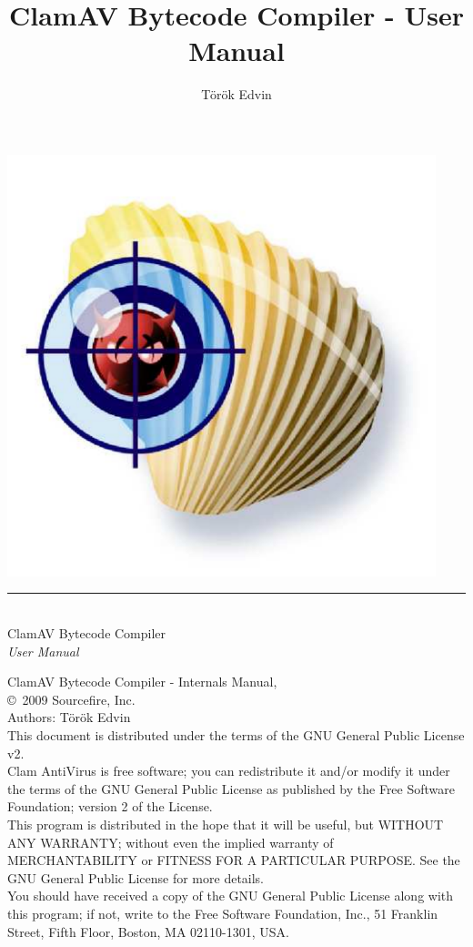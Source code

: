 \documentclass[a4paper,titlepage,12pt,english]{book}
\title{ClamAV Bytecode Compiler - User Manual}
\author{T\"{o}r\"{o}k Edvin}
\begin{document}
\frontmatter
\setcounter{page}{0}
\pagestyle{empty}
\includegraphics[width=353pt]{clam}
\vspace{3cm}
\begin{flushright}
  \rule[-1ex]{8cm}{3pt}\\
  \huge ClamAV Bytecode Compiler\\
        \huge \emph{User Manual}\\
\end{flushright}
\newpage
\setcounter{page}{1}
\pagestyle{fancy}
\tableofcontents
\vspace{1.0cm}
\noindent
\begin{boxedminipage}[b]{\textwidth}
    ClamAV Bytecode Compiler - Internals Manual,\\
    \copyright \  2009 Sourcefire, Inc.\\
    Authors: T\"{o}r\"{o}k Edvin\\
    This document is distributed under the terms of the GNU General
    Public License v2.\\

    Clam AntiVirus is free software; you can redistribute it and/or modify
    it under the terms of the GNU General Public License as published by
    the Free Software Foundation; version 2 of the License.\\

    This program is distributed in the hope that it will be useful,
    but WITHOUT ANY WARRANTY; without even the implied warranty of
    MERCHANTABILITY or FITNESS FOR A PARTICULAR PURPOSE.  See the
    GNU General Public License for more details.\\

    You should have received a copy of the GNU General Public License
    along with this program; if not, write to the Free Software
    Foundation, Inc., 51 Franklin Street, Fifth Floor, Boston,
    MA 02110-1301, USA.
\end{boxedminipage}
\end{document}
